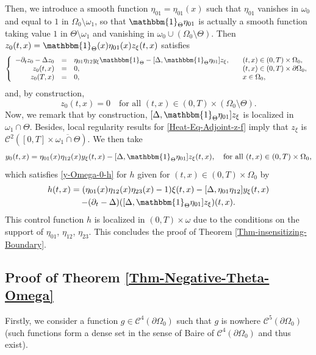 Then, we introduce a smooth function $\eta_{01} = \eta_{01}(x)$ such that $\eta_{01}$ vanishes in $ \omega_0$ and equal to $1$ in $\Omega_0 \setminus \omega_1$, so that $\mathbbm{1}_\Theta \eta_{01}$ is actually a smooth function taking value $1$ in $\Theta \setminus \omega_1$ and vanishing in $\omega_0 \cup (\Omega_0 \setminus \Theta)$. Then $ z_0(t,x)= \mathbbm{1}_\Theta(x) \eta_{01}(x) z_\xi(t,x)$ satisfies
\begin{equation*}
\left\{
\begin{array}{rcll}
- \partial_t z_0 - \Delta z_0 &=& \eta_{01} \eta_{12} y_\xi \mathbbm{1}_{\Theta}
- [\Delta, \mathbbm{1}_\Theta \eta_{01}] z_\xi
, \quad & (t,x) \in (0,T) \times \Omega_0,
\\
z_0(t, x) &=& 0, \quad & (t,x) \in (0,T) \times \partial \Omega_0,
\\
z_0(T,x) &=& 0, \quad & x \in \Omega_0,
\end{array}
\right.
\end{equation*}
and, by construction,
\[
z_0(t,x) = 0 \quad\text{for all } (t,x) \in (0,T) \times (\Omega_0 \setminus \Theta).
\]
Now, we remark that by construction, $[\Delta, \mathbbm{1}_\Theta \eta_{01}] z_\xi$ is localized in $\omega_1 \cap \Theta$. Besides, local regularity results for \eqref{Heat-Eq-Adjoint-z-f} imply that $z_\xi$ is $\mathscr{C}^2([0,T] \times \overline{\omega_1 \cap \Theta})$. We then take
\[
y_0(t,x) = \eta_{01}(x) \eta_{12}(x) y_\xi(t,x) - [\Delta, \mathbbm{1}_\Theta \eta_{01} ] z_\xi(t,x), \quad \text{for all } (t,x) \in (0,T) \times \Omega_0,
\]
which satisfies \eqref{y-Omega-0-h} for $h$ given for $(t,x) \in (0,T) \times \Omega_0$ by
\begin{multline*}
h(t,x) = (\eta_{01}(x) \eta_{12}(x) \eta_{23}(x)-1) \xi(t,x) - [\Delta, \eta_{01} \eta_{12}] y_\xi(t,x)\\
- (\partial_t - \Delta) ([\Delta, \mathbbm{1}_\Theta \eta_{01}] z_\xi)(t,x).
\end{multline*}
This control function $h$ is localized in $(0,T) \times \omega$ due to the conditions on the support of $\eta_{01}$, $\eta_{12}$, $\eta_{23}$. This concludes the proof of Theorem \ref{Thm-insensitizing-Boundary}.

\subsection{Proof of Theorem \ref{Thm-Negative-Theta-Omega}}
\label{Sec-Proof-Thm-Negative-Theta-Omega}

Firstly, we consider a function $g \in \mathscr{C}^4(\partial\Omega_0)$ such that $g$ is nowhere $\mathscr{C}^5(\partial \Omega_0)$ (such functions form a dense set in the sense of Baire of $\mathscr{C}^4(\partial \Omega_0)$ and thus exist).

